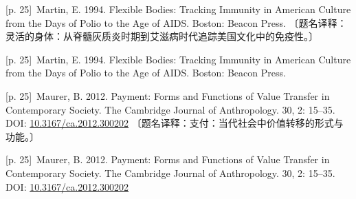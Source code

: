 \documentclass[10pt,a4paper]{article}
\begin{document}
\noindent\begin{minipage}{\textwidth}\begin{minipage}[t]{\dimexpr.5\textwidth-4mm\relax}\noindent\begin{minipage}[t]{\linewidth}{\scriptsize\color{gray} [p. 25]}\ Martin, E. 1994. Flexible Bodies: Tracking Immunity in American Culture from the Days of Polio to the Age of AIDS. Boston: Beacon Press. 〔题名译释：灵活的身体：从脊髓灰质炎时期到艾滋病时代追踪美国文化中的免疫性。〕\par\end{minipage}\par\end{minipage}\hfill\begin{minipage}[t]{\dimexpr.5\textwidth-4mm\relax}\noindent\begin{minipage}[t]{\linewidth}{\scriptsize\color{gray} [p. 25]}\ Martin, E. 1994. Flexible Bodies: Tracking Immunity in American Culture from the Days of Polio to the Age of AIDS. Boston: Beacon Press.\par\end{minipage}\par\end{minipage}\end{minipage}\par
\noindent\begin{minipage}{\textwidth}\begin{minipage}[t]{\dimexpr.5\textwidth-4mm\relax}\noindent\begin{minipage}[t]{\linewidth}{\scriptsize\color{gray} [p. 25]}\ Maurer, B. 2012. Payment: Forms and Functions of Value Transfer in Contemporary Society. The Cambridge Journal of Anthropology. 30, 2: 15–35. DOI: \url{10.3167/ca.2012.300202} 〔题名译释：支付：当代社会中价值转移的形式与功能。〕\par\end{minipage}\par\end{minipage}\hfill\begin{minipage}[t]{\dimexpr.5\textwidth-4mm\relax}\noindent\begin{minipage}[t]{\linewidth}{\scriptsize\color{gray} [p. 25]}\ Maurer, B. 2012. Payment: Forms and Functions of Value Transfer in Contemporary Society. The Cambridge Journal of Anthropology. 30, 2: 15–35. DOI: \url{10.3167/ca.2012.300202}\par\end{minipage}\par\end{minipage}\end{minipage}\par
\end{document}

